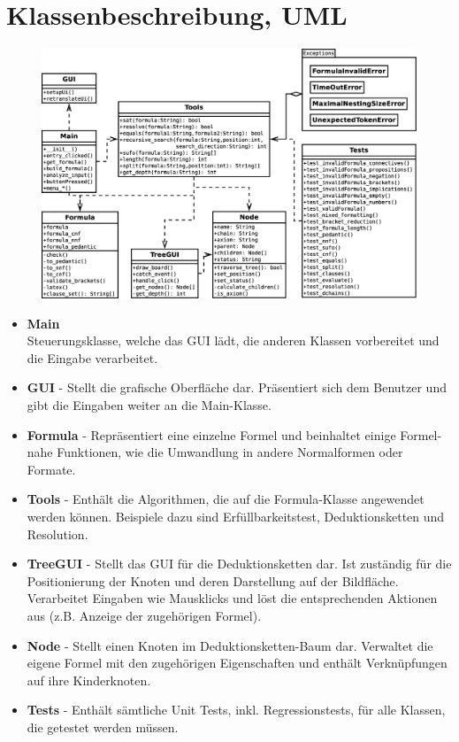 \documentclass[11pt,a4paper,ngerman]{scrreprt}
\begin{document}
\section{Klassenbeschreibung, UML}
\label{section:verantwortlichkeiten}

\begin{figure}[h]
\centering
\includegraphics[width=.95\linewidth]{pics/UML.eps}
\end{figure}

\begin{itemize}
 \item \textbf{Main} \\
 Steuerungsklasse, welche das GUI lädt, die anderen Klassen vorbereitet und die Eingabe verarbeitet.
 
 \item \textbf{GUI} -
 Stellt die grafische Oberfläche dar. Präsentiert sich dem Benutzer und gibt die Eingaben weiter an die Main-Klasse.
 
 \item \textbf{Formula} -
 Repräsentiert eine einzelne Formel und beinhaltet einige Formel-nahe Funktionen, wie die Umwandlung in andere Normalformen oder Formate.
 
 \item \textbf{Tools} -
 Enthält die Algorithmen, die auf die Formula-Klasse angewendet werden können. Beispiele dazu sind Erfüllbarkeitstest, Deduktionsketten und Resolution.

 \item \textbf{TreeGUI} -
 Stellt das GUI für die Deduktionsketten dar. Ist zuständig für die Positionierung der Knoten und deren Darstellung auf der Bildfläche. Verarbeitet Eingaben wie Mausklicks und löst die entsprechenden Aktionen aus (z.B. Anzeige der zugehörigen Formel).
 
 \item \textbf{Node} -
 Stellt einen Knoten im Deduktionsketten-Baum dar. Verwaltet die eigene Formel mit den zugehörigen Eigenschaften und enthält Verknüpfungen auf ihre Kinderknoten.
 
 \item \textbf{Tests} -
 Enthält sämtliche Unit Tests, inkl. Regressionstests, für alle Klassen, die getestet werden müssen.
\end{itemize}
\end{document}
